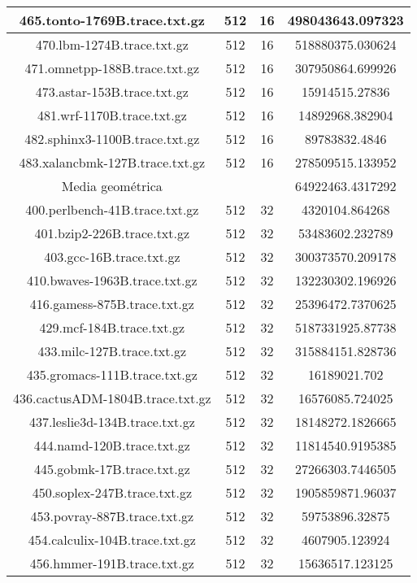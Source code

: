 \begin{table}[H]
\begin{center}
{\begin{tabular}{|c|c|c|c|}
		\hline
		465.tonto-1769B.trace.txt.gz	&	512	&	16	&	498043643.097323	\\
		\hline
		470.lbm-1274B.trace.txt.gz	&	512	&	16	&	518880375.030624	\\
		\hline
		471.omnetpp-188B.trace.txt.gz	&	512	&	16	&	307950864.699926	\\
		\hline
		473.astar-153B.trace.txt.gz	&	512	&	16	&	15914515.27836	\\
		\hline
		481.wrf-1170B.trace.txt.gz	&	512	&	16	&	14892968.382904	\\
		\hline
		482.sphinx3-1100B.trace.txt.gz	&	512	&	16	&	89783832.4846	\\
		\hline
		483.xalancbmk-127B.trace.txt.gz	&	512	&	16	&	278509515.133952	\\
		\hline
		\hline
		Media geométrica	&	&		&	64922463.4317292	\\
		\hline
		400.perlbench-41B.trace.txt.gz	&	512	&	32	&	4320104.864268	\\
		\hline
		401.bzip2-226B.trace.txt.gz	&	512	&	32	&	53483602.232789	\\
		\hline
		403.gcc-16B.trace.txt.gz	&	512	&	32	&	300373570.209178	\\
		\hline
		410.bwaves-1963B.trace.txt.gz	&	512	&	32	&	132230302.196926	\\
		\hline
		416.gamess-875B.trace.txt.gz	&	512	&	32	&	25396472.7370625	\\
		\hline
		429.mcf-184B.trace.txt.gz	&	512	&	32	&	5187331925.87738	\\
		\hline
		433.milc-127B.trace.txt.gz	&	512	&	32	&	315884151.828736	\\
		\hline
		435.gromacs-111B.trace.txt.gz	&	512	&	32	&	16189021.702	\\
		\hline
		436.cactusADM-1804B.trace.txt.gz	&	512	&	32	&	16576085.724025	\\
		\hline
		437.leslie3d-134B.trace.txt.gz	&	512	&	32	&	18148272.1826665	\\
		\hline
		444.namd-120B.trace.txt.gz	&	512	&	32	&	11814540.9195385	\\
		\hline
		445.gobmk-17B.trace.txt.gz	&	512	&	32	&	27266303.7446505	\\
		\hline
		450.soplex-247B.trace.txt.gz	&	512	&	32	&	1905859871.96037	\\
		\hline
		453.povray-887B.trace.txt.gz	&	512	&	32	&	59753896.32875	\\
		\hline
		454.calculix-104B.trace.txt.gz	&	512	&	32	&	4607905.123924	\\
		\hline
		456.hmmer-191B.trace.txt.gz	&	512	&	32	&	15636517.123125	\\

\end{tabular}}
\end{center}
\end{table}
